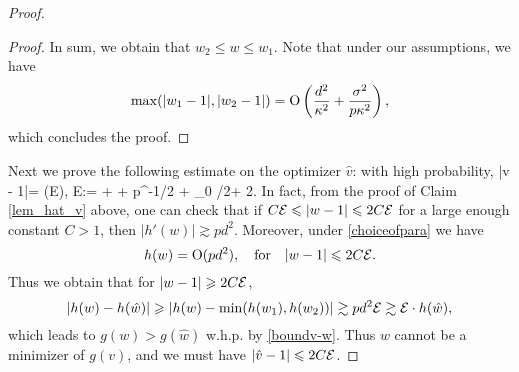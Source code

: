 \begin{proof}
\begin{proof}
In sum, we obtain that $w_2\le w\le w_1$. Note that under our assumptions, we have
$$\max(|w_1 -1|, |w_2 -1|) =\OO\left(\frac{d^2}{\kappa^2} + \frac{\sigma^2}{p\kappa^2}\right),$$
which concludes the proof.
\end{proof}

Next we prove the following estimate on the optimizer $\hat v$: with high probability,
\be\label{hatv_add1}
|\hat v - 1|= \OO\left(\cal E\right), \quad \cal E:= +  + p^{-1/2 + \e_0 /2+ 2\e}.
\ee
 In fact, from the proof of Claim \ref{lem_hat_v} above, one can check that if $C\cal E \le |w-1| \le 2C\cal E$ for a large enough constant $C>1$, then $|h'(w)|\gtrsim p d^2$. Moreover, under \eqref{choiceofpara} we have
$$h(w) =\OO(pd^2),\quad \text{for}\quad   |w-1|\le 2C\cal E.$$
Thus we obtain that for $|w-1|\ge 2C\cal E$,
$$\left|h(w) - h(\hat w)\right|\ge |h(w)-\min(h(w_1),h(w_2))|\gtrsim pd^2 \cal E \gtrsim \cal E \cdot h(\hat w),$$
which leads to $g(w) > g(\hat w)$ w.h.p. by \eqref{boundv-w}. Thus $w$ cannot be a minimizer of $g(v)$, and we must have $|\hat v - 1|\le 2C\cal E$. %


\end{proof}

